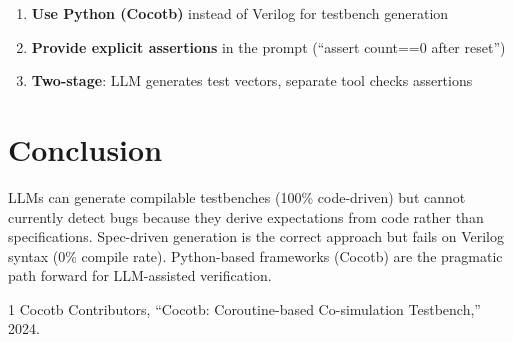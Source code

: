 \documentclass[conference]{IEEEtran}
\begin{document}
\begin{enumerate}
    \item \textbf{Use Python (Cocotb)} instead of Verilog for
    testbench generation
    \item \textbf{Provide explicit assertions} in the prompt
    (``assert count==0 after reset'')
    \item \textbf{Two-stage}: LLM generates test vectors,
    separate tool checks assertions
\end{enumerate}

\section{Conclusion}

LLMs can generate compilable testbenches (100\% code-driven) but
cannot currently detect bugs because they derive expectations from
code rather than specifications. Spec-driven generation is the
correct approach but fails on Verilog syntax (0\% compile rate).
Python-based frameworks (Cocotb) are the pragmatic path forward
for LLM-assisted verification.


\begin{thebibliography}{1}
 Cocotb Contributors, ``Cocotb: Coroutine-based Co-simulation Testbench,'' 2024.
\end{thebibliography}
\end{document}
